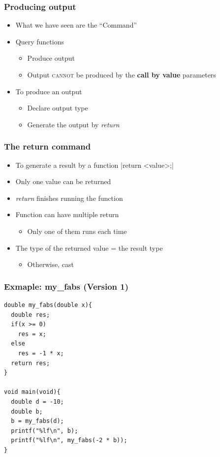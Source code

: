 \documentclass{../c-lecture}
\begin{document}
\begin{frame}
  \frametitle{Producing output}
  \begin{itemize}
    \item What we have seen are the ``Command''
    \item Query functions
    \begin{itemize}
      \item Produce output
      \item
        Output \textsc{\color{RubineRed} cannot} be produced by the \textbf{\color{YellowOrange} call by value} parameters
    \end{itemize}
    \item To produce an output
    \begin{itemize}
      \item Declare output type
      \item Generate the output by \textit{\color{YellowOrange} return}
    \end{itemize}
  \end{itemize}
\end{frame}

\begin{frame}[fragile]
  \frametitle{The return command}
  \begin{itemize}
    \item To generate a result by a function
    |return <value>;|
    \item Only one value can be returned
    \item \textit{\color{LimeGreen} return} finishes running the function
    \item Function can have multiple return
    \begin{itemize}
      \item Only one of them runs each time
    \end{itemize}
    \item The type of the returned value = the result type
    \begin{itemize}
      \item Otherwise, cast
    \end{itemize}
  \end{itemize}
\end{frame}

\begin{frame}[fragile]
  \frametitle{Exmaple: my\_fabs (Version 1)}
  \scriptsize
  \begin{verbatim}
double my_fabs(double x){
  double res;
  if(x >= 0)
    res = x;
  else
    res = -1 * x;
  return res;
}

void main(void){
  double d = -10;
  double b;
  b = my_fabs(d);
  printf("%lf\n", b);
  printf("%lf\n", my_fabs(-2 * b));
}
  \end{verbatim}
\end{frame}
\end{document}
